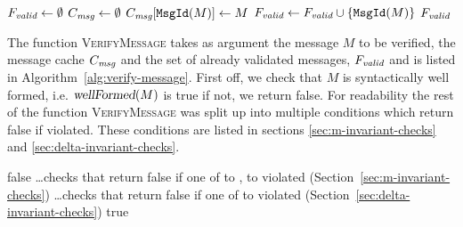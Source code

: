\begin{algorithm}[ht]
\caption{Basic structure of the verifying algorithm}
\begin{algorithmic}[1]
    \State $F_\emph{valid} \gets \emptyset$ 
    \State $C_\emph{msg} \gets \emptyset$ 
        \State $C_\emph{msg}[\texttt{MsgId}(M)] \gets M$
            \State $F_\emph{valid} \gets F_\emph{valid} \cup \{\texttt{MsgId}(M)\}$ 
        \EndIf
    \EndFor
    \State \Return $F_\emph{valid}$
\EndFunction
\end{algorithmic}
\end{algorithm}

The function \textsc{VerifyMessage} takes as argument the message $M$ to be verified, the message cache $C_\emph{msg}$ and the set of already validated messages, $F_\emph{valid}$ and is listed in Algorithm~\ref{alg:verify-message}. First off, we check that $M$ is syntactically well formed, i.e. $\textsl{wellFormed}(M)$ is true if not, we return false.
For readability the rest of the function \textsc{VerifyMessage} was split up into multiple conditions which return false if violated. These conditions are listed in sections \ref{sec:m-invariant-checks} and \ref{sec:delta-invariant-checks}.

\begin{algorithm}[ht]
    \caption{Basic structure of the function verifying individual messages}
    \label{alg:verify-message}
\begin{algorithmic}
        \State \Return false
    \EndIf
    \State \ldots \Comment checks that return false if one of  to ,  to  violated (Section~\ref{sec:m-invariant-checks})
        \State \ldots \Comment checks that return false if one of  to  violated (Section~\ref{sec:delta-invariant-checks})
    \EndIf
    \State \Return true
\EndFunction
\end{algorithmic}
\end{algorithm}

